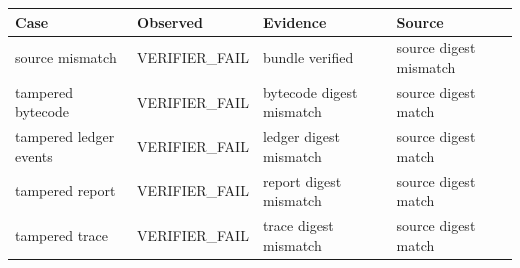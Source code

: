\begin{tabularx}{\textwidth}{@{}XXXX@{}}
\toprule
Case & Observed & Evidence & Source \\
\midrule
source mismatch & VERIFIER\_FAIL & bundle verified & source digest mismatch \\
tampered bytecode & VERIFIER\_FAIL & bytecode digest mismatch & source digest match \\
tampered ledger events & VERIFIER\_FAIL & ledger digest mismatch & source digest match \\
tampered report & VERIFIER\_FAIL & report digest mismatch & source digest match \\
tampered trace & VERIFIER\_FAIL & trace digest mismatch & source digest match \\
\bottomrule
\end{tabularx}
